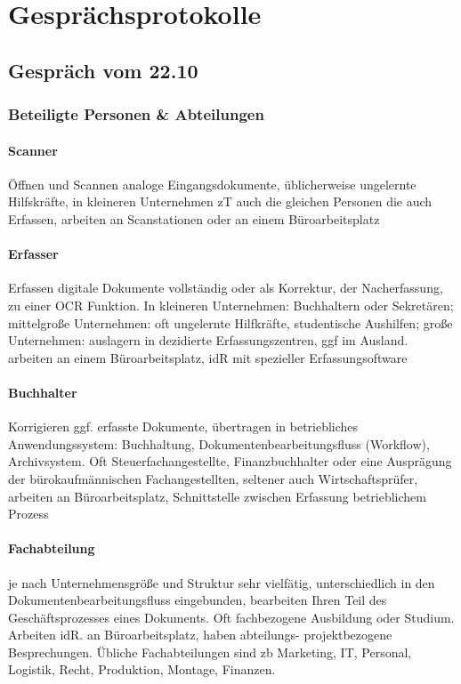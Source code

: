 \section{Gesprächsprotokolle}


\subsection{Gespräch vom 22.10}
\subsubsection{Beteiligte Personen \& Abteilungen}
\label{subsec:gespraech_personen}

\paragraph*{Scanner}
Öffnen und Scannen analoge Eingangsdokumente, üblicherweise ungelernte Hilfskräfte, in kleineren Unternehmen zT auch die gleichen Personen die auch Erfassen, arbeiten an Scanstationen oder an einem Büroarbeitsplatz

\paragraph*{Erfasser}
%
Erfassen digitale Dokumente vollständig oder als Korrektur, der Nacherfassung, zu einer OCR Funktion. In kleineren Unternehmen: Buchhaltern oder Sekretären; mittelgroße Unternehmen: oft ungelernte Hilfkräfte, studentische Aushilfen; große Unternehmen: auslagern in dezidierte Erfassungszentren, ggf im Ausland. arbeiten an einem Büroarbeitsplatz, idR mit spezieller Erfassungsoftware

%
\paragraph*{Buchhalter}
Korrigieren ggf. erfasste Dokumente, übertragen in betriebliches Anwendungssystem: Buchhaltung, Dokumentenbearbeitungsfluss (Workflow), Archivsystem. Oft Steuerfachangestellte, Finanzbuchhalter oder eine Ausprägung der bürokaufmännischen Fachangestellten, seltener auch Wirtschaftsprüfer, arbeiten an Büroarbeitsplatz, Schnittstelle zwischen Erfassung betrieblichem Prozess

%
\paragraph*{Fachabteilung}
je nach Unternehmensgröße und Struktur sehr vielfätig, unterschiedlich in den Dokumentenbearbeitungsfluss eingebunden, bearbeiten Ihren Teil des Geschäftsprozesses eines Dokuments. Oft fachbezogene Ausbildung oder Studium. Arbeiten idR. an Büroarbeitsplatz, haben abteilungs- projektbezogene Besprechungen. Übliche Fachabteilungen sind zb Marketing, IT, Personal, Logistik, Recht, Produktion, Montage, Finanzen.

